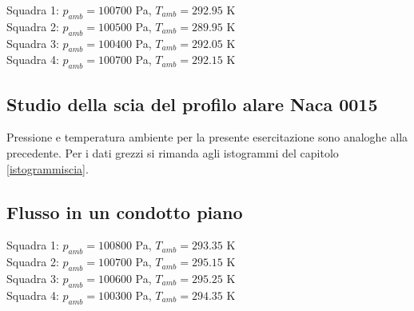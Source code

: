 \noindent Squadra 1: $p_{amb}=100700$ Pa, $T_{amb}=292.95$ K\\
Squadra 2: $p_{amb}=100500$ Pa, $T_{amb}=289.95$ K\\
Squadra 3: $p_{amb}=100400$ Pa, $T_{amb}=292.05$ K\\
Squadra 4: $p_{amb}=100700$ Pa, $T_{amb}=292.15$ K

\subsection{Studio della scia del profilo alare Naca 0015}\label{a6}
Pressione e temperatura ambiente per la presente esercitazione sono analoghe alla precedente. Per i dati grezzi si rimanda agli istogrammi del capitolo \ref{istogrammiscia}.

\subsection{Flusso in un condotto piano}\label{a7}
Squadra 1: $p_{amb}=100800$ Pa, $T_{amb}=293.35$ K\\
Squadra 2: $p_{amb}=100700$ Pa, $T_{amb}=295.15$ K\\
Squadra 3: $p_{amb}=100600$ Pa, $T_{amb}=295.25$ K\\
Squadra 4: $p_{amb}=100300$ Pa, $T_{amb}=294.35$ K

